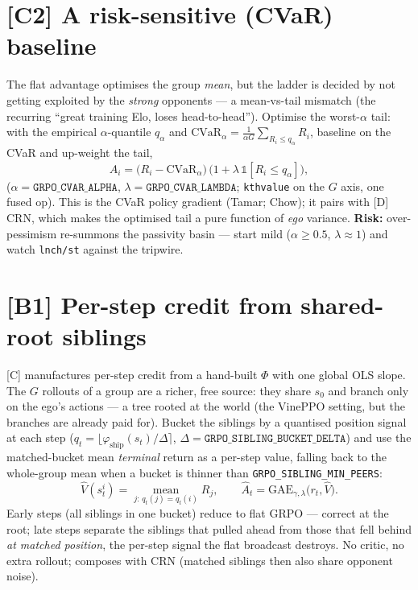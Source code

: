 \documentclass[11pt]{article}
\newcommand{\Adv}{\widehat{A}}
\newcommand{\cd}[1]{\texttt{#1}}
\begin{document}
\section{[C2] A risk-sensitive (CVaR) baseline}\label{sec:cvar}
The flat advantage optimises the group \emph{mean}, but the ladder is decided by not getting exploited by
the \emph{strong} opponents --- a mean-vs-tail mismatch (the recurring ``great training Elo, loses
head-to-head''). Optimise the worst-$\alpha$ tail: with the empirical $\alpha$-quantile $q_\alpha$ and
$\mathrm{CVaR}_\alpha=\tfrac1{\alpha G}\sum_{R_i\le q_\alpha}R_i$, baseline on the CVaR and up-weight the
tail,
\begin{equation}
\Adv_i=\big(R_i-\mathrm{CVaR}_\alpha\big)\,\big(1+\lambda\,\mathbb 1[R_i\le q_\alpha]\big),
\end{equation}
($\alpha=\cd{GRPO\_CVAR\_ALPHA}$, $\lambda=\cd{GRPO\_CVAR\_LAMBDA}$; \cd{kthvalue} on the $G$ axis, one
fused op). This is the CVaR policy gradient (Tamar; Chow); it pairs with [D] CRN, which makes the optimised
tail a pure function of \emph{ego} variance. \textbf{Risk:} over-pessimism re-summons the passivity basin
--- start mild ($\alpha\ge0.5$, $\lambda\approx1$) and watch \cd{lnch/st} against the tripwire.

\section{[B1] Per-step credit from shared-root siblings}\label{sec:sibling}
[C] manufactures per-step credit from a hand-built $\Phi$ with one global OLS slope. The $G$ rollouts of a
group are a richer, free source: they share $s_0$ and branch only on the ego's actions --- a tree rooted at
the world (the VinePPO setting, but the branches are already paid for). Bucket the siblings by a quantised
position signal at each step ($q_t=\lfloor\varphi_{\text{ship}}(s_t)/\Delta\rceil$,
$\Delta=\cd{GRPO\_SIBLING\_BUCKET\_DELTA}$) and use the matched-bucket mean \emph{terminal} return as a
per-step value, falling back to the whole-group mean when a bucket is thinner than
\cd{GRPO\_SIBLING\_MIN\_PEERS}:
\begin{equation}
\widehat V(s^i_t)=\!\!\operatorname*{mean}_{j:\,q_t(j)=q_t(i)}\!\!R_j,\qquad \Adv_t=\text{GAE}_{\gamma,\lambda}\big(r_t,\widehat V\big).
\end{equation}
Early steps (all siblings in one bucket) reduce to flat GRPO --- correct at the root; late steps separate
the siblings that pulled ahead from those that fell behind \emph{at matched position}, the per-step signal
the flat broadcast destroys. No critic, no extra rollout; composes with CRN (matched siblings then also
share opponent noise).
\end{document}
